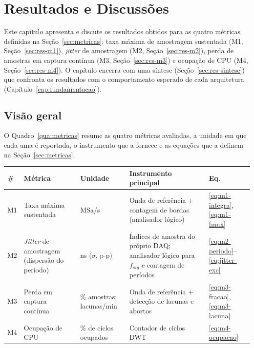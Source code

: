 \chapter{Resultados e Discussões}\label{cap:resultados}

Este capítulo apresenta e discute os resultados obtidos para as quatro
métricas definidas na Seção~\ref{sec:metricas}: taxa máxima de
amostragem sustentada (M1, Seção~\ref{sec:res-m1}), \emph{jitter} de
amostragem (M2, Seção~\ref{sec:res-m2}), perda de amostras em captura
contínua (M3, Seção~\ref{sec:res-m3}) e ocupação de \ac{CPU} (M4,
Seção~\ref{sec:res-m4}). O capítulo
encerra com uma síntese (Seção~\ref{sec:res-sintese}) que confronta os
resultados com o comportamento esperado de cada arquitetura
(Capítulo~\ref{cap:fundamentacao}).

\section{Visão geral}

O Quadro~\ref{qua:metricas} resume as quatro métricas avaliadas, a unidade
em que cada uma é reportada, o instrumento que a fornece e as equações que a
definem na Seção~\ref{sec:metricas}.

\begin{quadro}[H]
  \centering
  \caption{Resumo das métricas de comparação.}
  \label{qua:metricas}
  \begin{tabularx}{\linewidth}{|l|>{\raggedright\arraybackslash}p{2.9cm}|>{\raggedright\arraybackslash}p{2.4cm}|>{\raggedright\arraybackslash}X|l|}
    \hline
    \textbf{\#} & \textbf{Métrica}            & \textbf{Unidade}         & \textbf{Instrumento principal} & \textbf{Eq.} \\ \hline
    M1          & Taxa máxima sustentada      & MSa/s                      & Onda de referência + contagem de bordas (analisador lógico) & \ref{eq:m1-integra}, \ref{eq:m1-fmax} \\ \hline
    M2          & \emph{Jitter} de amostragem (dispersão do período) & ns ($\sigma$, p-p)       & Índices de amostra do próprio \acs{DAQ}; analisador lógico para $f_{sig}$ e contagem de períodos & \ref{eq:m2-periodo}--\ref{eq:jitter-exc} \\ \hline
    M3          & Perda em captura contínua   & \% amostras; lacunas/min & Onda de referência + detecção de lacunas e abortos & \ref{eq:m3-fracao}, \ref{eq:m3-lacuna} \\ \hline
    M4          & Ocupação de \acs{CPU}             & \% de ciclos ocupados    & Contador de ciclos \acs{DWT} & \ref{eq:m4-ocupacao} \\ \hline
  \end{tabularx}
\end{quadro}

